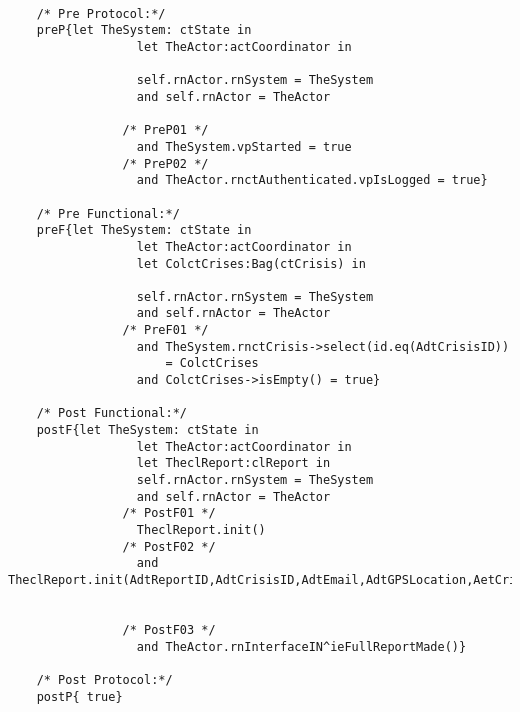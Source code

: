 	\scriptsize
	\vspace{0.5cm}
	\begin{lstlisting}[style=MessirStyle,firstnumber=auto,captionpos=b,caption={\msrmessir (MCL-oriented) specification of the operation \emph{oeMakeFullReport}.},label=OM-actCoordinator-oeMakeFullReport-MCL-LST]

	/* Pre Protocol:*/ 
	preP{let TheSystem: ctState in
				  let TheActor:actCoordinator in
				  
				  self.rnActor.rnSystem = TheSystem
				  and self.rnActor = TheActor
				  
				/* PreP01 */
				  and TheSystem.vpStarted = true
				/* PreP02 */
				  and TheActor.rnctAuthenticated.vpIsLogged = true}
	
	/* Pre Functional:*/
	preF{let TheSystem: ctState in
				  let TheActor:actCoordinator in
				  let ColctCrises:Bag(ctCrisis) in
				  
				  self.rnActor.rnSystem = TheSystem
				  and self.rnActor = TheActor
				/* PreF01 */
				  and TheSystem.rnctCrisis->select(id.eq(AdtCrisisID))
				      = ColctCrises
				  and ColctCrises->isEmpty() = true}
	
	/* Post Functional:*/ 
	postF{let TheSystem: ctState in
				  let TheActor:actCoordinator in
				  let TheclReport:clReport in
				  self.rnActor.rnSystem = TheSystem
				  and self.rnActor = TheActor
				/* PostF01 */
				  TheclReport.init()
				/* PostF02 */
				  and TheclReport.init(AdtReportID,AdtCrisisID,AdtEmail,AdtGPSLocation,AetCrisisStatus,AetCrisisType,AptString)
				
	
				/* PostF03 */  
				  and TheActor.rnInterfaceIN^ieFullReportMade()}
	
	/* Post Protocol:*/ 
	postP{ true}
	
	\end{lstlisting}
	\normalsize 
	
	
	
	





